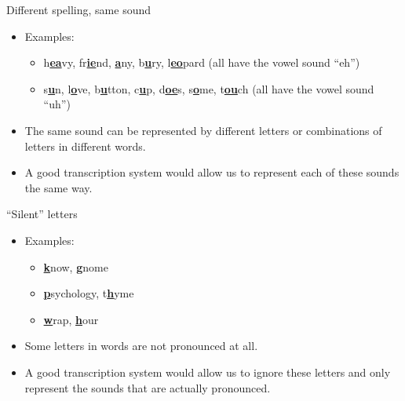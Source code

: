\documentclass[professionalfonts]{beamer}
\begin{document}
\begin{frame}{Different spelling, same sound}
    \begin{itemize}
        \item Examples:
        \begin{itemize}
            \item h\underline{\textbf{ea}}vy, fr\underline{\textbf{ie}}nd, \underline{\textbf{a}}ny, b\underline{\textbf{u}}ry, l\underline{\textbf{eo}}pard (all have the vowel sound ``eh'')
            \item s\underline{\textbf{u}}n, l\underline{\textbf{o}}ve, b\underline{\textbf{u}}tton, c\underline{\textbf{u}}p, d\underline{\textbf{oe}}s, s\underline{\textbf{o}}me, t\underline{\textbf{ou}}ch (all have the vowel sound ``uh'')
        \end{itemize}
        \item The same sound can be represented by different letters or combinations of letters in different words.
        \item A good transcription system would allow us to represent each of these sounds the same way.
    \end{itemize}
\end{frame}

\begin{frame}{``Silent'' letters}
    \begin{itemize}
        \item Examples:
        \begin{itemize}
            \item \underline{\textbf{k}}now, \underline{\textbf{g}}nome
            \item \underline{\textbf{p}}sychology, t\underline{\textbf{h}}yme
            \item \underline{\textbf{w}}rap, \underline{\textbf{h}}our
        \end{itemize}
        \item Some letters in words are not pronounced at all.
        \item A good transcription system would allow us to ignore these letters and only represent the sounds that are actually pronounced.
    \end{itemize}
\end{frame}
\end{document}
